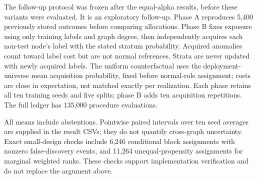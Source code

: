 The follow-up protocol was frozen after the equal-alpha results, before these variants were evaluated. It is an exploratory follow-up. Phase A reproduces 5,400 previously stored outcomes before comparing allocations. Phase B fixes exposure using only training labels and graph degree, then independently acquires each non-test node's label with the stated stratum probability. Acquired anomalies count toward label cost but are not normal references. Strata are never updated with newly acquired labels. The uniform counterfactual uses the deployment-universe mean acquisition probability, fixed before normal-role assignment; costs are close in expectation, not matched exactly per realization. Each phase retains all ten training seeds and five splits; phase B adds ten acquisition repetitions. The full ledger has 135,000 procedure evaluations.

All means include abstentions. Pointwise paired intervals over ten seed averages are supplied in the result CSVs; they do not quantify cross-graph uncertainty. Exact small-design checks include 6,246 conditional block assignments with nonzero false-discovery events, and 11,264 unequal-propensity assignments for marginal weighted ranks. These checks support implementation verification and do not replace the argument above.

